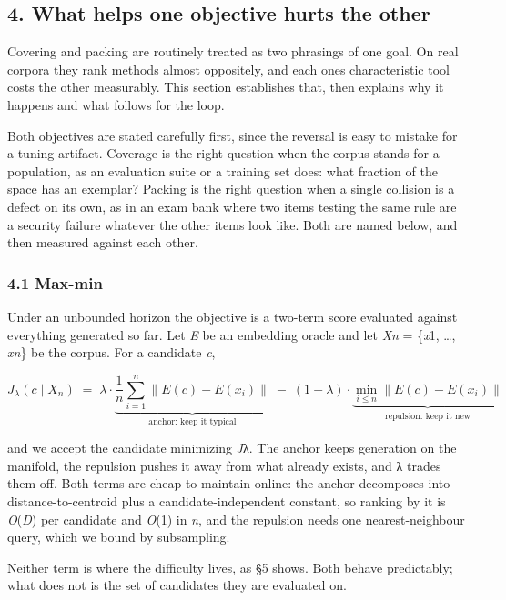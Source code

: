 \documentclass[
  10pt,
]{article}
\theoremstyle{plain}
\theoremstyle{definition}
\begin{document}
\subsection{4. What helps one objective hurts the
other}\label{4-what-helps-one-objective-hurts-the-other}

Covering and packing are routinely treated as two phrasings of one goal.
On real corpora they rank methods almost oppositely, and each
one\textquotesingle s characteristic tool costs the other measurably.
This section establishes that, then explains why it happens and what
follows for the loop.

Both objectives are stated carefully first, since the reversal is easy
to mistake for a tuning artifact. Coverage is the right question when
the corpus stands for a population, as an evaluation suite or a training
set does: what fraction of the space has an exemplar? Packing is the
right question when a single collision is a defect on its own, as in an
exam bank where two items testing the same rule are a security failure
whatever the other items look like. Both are named below, and then
measured against each other.

\subsubsection{4.1 Max-min}\label{41-max-min}

Under an unbounded horizon the objective is a two-term score evaluated
against everything generated so far. Let \emph{E} be an embedding oracle
and let \emph{Xn} = \{\emph{x}1, \ldots, \emph{xn}\} be the corpus. For
a candidate \emph{c},

\[
J_\lambda(c \mid X_n) \;=\; \lambda \cdot \underbrace{\frac{1}{n}\sum_{i=1}^{n}\lVert E(c) - E(x_i)\rVert}_{\text{anchor: keep it typical}} \;-\; (1-\lambda)\cdot \underbrace{\min_{i \le n} \lVert E(c) - E(x_i)\rVert}_{\text{repulsion: keep it new}}
\]

and we accept the candidate minimizing \emph{J}λ. The anchor keeps
generation on the manifold, the repulsion pushes it away from what
already exists, and λ trades them off. Both terms are cheap to maintain
online: the anchor decomposes into distance-to-centroid plus a
candidate-independent constant, so ranking by it is \emph{O}(\emph{D})
per candidate and \emph{O}(1) in \emph{n}, and the repulsion needs one
nearest-neighbour query, which we bound by subsampling.

Neither term is where the difficulty lives, as §5 shows. Both behave
predictably; what does not is the set of candidates they are evaluated
on.
\end{document}
